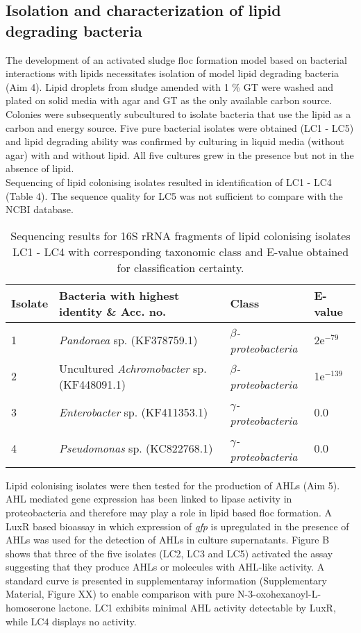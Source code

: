 \documentclass[twoside]{article}
\begin{document}
\subsection{Isolation and characterization of lipid degrading bacteria}

The development of an activated sludge floc formation model based on bacterial interactions with lipids necessitates isolation of model lipid degrading bacteria (Aim 4). Lipid droplets from sludge amended with 1 \% GT were washed and plated on solid media with agar and GT as the only available carbon source. Colonies were subsequently subcultured to isolate bacteria that use the lipid as a carbon and energy source. Five pure bacterial isolates were obtained (LC1 - LC5) and lipid degrading ability was confirmed by culturing in liquid media (without agar) with and without lipid. All five cultures grew in the presence but not in the absence of lipid. \\

Sequencing of lipid colonising isolates resulted in identification of LC1 - LC4 (Table 4). The sequence quality for LC5 was not sufficient to compare with the NCBI database.

\begin{table}
\caption{Sequencing results for 16S rRNA fragments of lipid colonising isolates LC1 - LC4 with corresponding taxonomic class and E-value obtained for classification certainty.}
\begin{tabular}{ | l | p{7.8cm} | p{3cm} | l | }
\hline
Isolate & Bacteria with highest identity \& Acc. no. & Class & E-value \\
\hline
1 &  \emph{Pandoraea} sp. (KF378759.1) & \emph{$\beta$-proteobacteria} & 2e$^{-79}$ \\
\hline
2 & Uncultured \emph{Achromobacter} sp. (KF448091.1) & \emph{$\beta$-proteobacteria} & 1e$^{-139}$ \\
\hline
3 & \emph{Enterobacter} sp. (KF411353.1) & \emph{$\gamma$-proteobacteria} & 0.0 \\
\hline
4 & \emph{Pseudomonas} sp. (KC822768.1) & \emph{$\gamma$-proteobacteria} & 0.0 \\
\hline
\end{tabular}
\end{table}



Lipid colonising isolates were then tested for the production of AHLs (Aim 5). AHL mediated gene expression has been linked to lipase activity in proteobacteria and therefore may play a role in lipid based floc formation. A LuxR based bioassay in which expression of \emph{gfp} is upregulated in the presence of AHLs was used for the detection of AHLs in culture supernatants. Figure B shows that three of the five isolates (LC2, LC3 and LC5) activated the assay suggesting that they produce AHLs or molecules with AHL-like activity. A standard curve is presented in supplementaray information (Supplementary Material, Figure XX) to enable comparison with pure N-3-oxohexanoyl-L-homoserone lactone. LC1 exhibits minimal AHL activity detectable by LuxR, while LC4 displays no activity.\\
\end{document}
